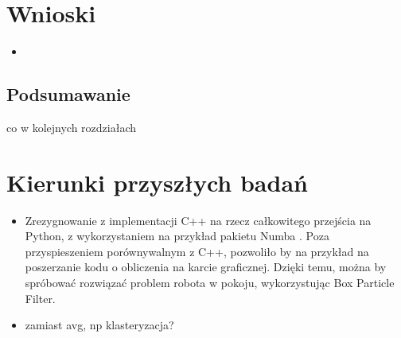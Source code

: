 \chapter{Wnioski}
\begin{itemize}
	\item 
\end{itemize}
\section{Podsumawanie}
co w kolejnych rozdziałach

\chapter{Kierunki przyszłych badań}
\begin{itemize}
	\item Zrezygnowanie z implementacji C++ na rzecz całkowitego przejścia na Python, z wykorzystaniem na przykład pakietu Numba \cite{numba}. Poza przyspieszeniem porównywalnym z C++, pozwoliło by na przykład na poszerzanie kodu o obliczenia na karcie graficznej. Dzięki temu, można by spróbować rozwiązać problem robota w pokoju, wykorzystując Box Particle Filter.
	\item zamiast avg, np klasteryzacja?
\end{itemize}